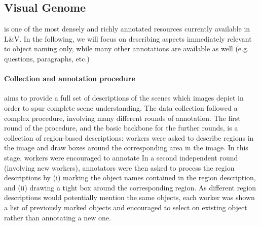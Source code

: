 \subsection{Visual Genome}

\vg \cite{krishna2016visualgenome} is one of the most densely and richly annotated resources currently available in L\&V. In the following, we will focus on describing aspects immediately relevant to object naming only, while many other annotations are available as well (e.g. questions, paragraphs, etc.)

\paragraph{Collection and annotation procedure}

\vg aims to provide a full set of descriptions of the scenes which images depict in order to spur complete scene understanding. 
The data collection followed a complex procedure, involving many different rounds of annotation. The first round of the procedure, and the basic backbone for the further rounds, is a collection of region-based descriptions: workers were asked to describe regions in the image and draw boxes around the corresponding area in the image. In this stage, workers were encouraged to annotate 
In a second independent round (involving new workers), annotators were then asked to process the region descriptions by (i) marking the object names contained in the region description, and (ii) drawing a tight box around the corresponding region. As different region descriptions would potentially mention the same objects, each worker was shown a list of previously marked objects and encouraged to select on existing object rather than annotating a new one.


